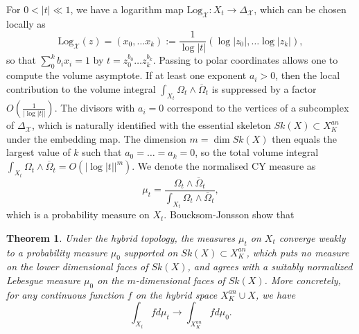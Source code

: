 \documentclass[a4paper]{article}
\newtheorem{thm}{Theorem}[section]
\theoremstyle{definition}
\begin{document}
	For $0<|t|\ll 1$, we have a logarithm map $\text{Log}_\mathcal{X}: X_t\to \Delta_\mathcal{X}$, which can be chosen locally as
	\[
	\text{Log}_{\mathcal{X}} (z)=(x_0,\ldots x_k):=  \frac{1}{\log |t|}(   \log |z_0|, \ldots \log |z_k|      ),
	\]
	so that $\sum_0^k b_i x_i=1$ by $t= z_0^{b_0}\ldots z_k^{b_k}$. Passing to polar coordinates allows one to compute the volume asymptote.
	If at least one exponent $a_i>0$, then the local contribution to the volume integral $\int_{X_t} \Omega_t\wedge \overline{\Omega}_t$ is suppressed by a factor $O(\frac{1}{|\log |t||})$. The divisors with $a_i=0$ correspond to the vertices of a subcomplex of $\Delta_{\mathcal{X}}$, which is naturally identified with the essential skeleton $Sk(X)\subset X_K^{an}$ under the embedding map.  The dimension $m=\dim Sk(X)$ then equals the largest value of $k$ such that $a_0=\ldots =a_k=0$, so the total volume integral $\int_{X_t} \Omega_t\wedge \overline{\Omega}_t=O(|\log |t||^m)$. We denote the normalised CY measure as
	\[
	\mu_t= \frac{  \Omega_t\wedge \overline{\Omega}_t }{   \int_{X_t} \Omega_t\wedge \overline{\Omega}_t      } ,
	\]
	which is a probability measure on $X_t$.
	Boucksom-Jonsson \cite{Boucksom} show that
	
	
	\begin{thm}\label{Volumeconvergence}
		Under the hybrid topology, the measures $\mu_t$ on $X_t$ converge weakly to a probability measure $\mu_0$ supported on $Sk(X)\subset X_K^{an}$, which puts no measure on the lower dimensional faces of $Sk(X)$, and agrees with a suitably normalized Lebesgue measure $\mu_0$ on the $m$-dimensional faces of $Sk(X)$.
		More concretely, for any continuous function $f$ on the hybrid space $X_K^{an}\cup X$, we have
		\[
		\int_{X_t} fd\mu_t\to \int_{X_K^{an}} fd\mu_0.
		\]
	\end{thm}
	
	
	
	
	
	
	

	
\end{document}

